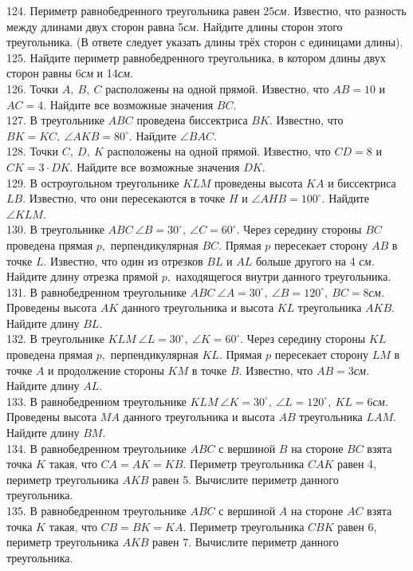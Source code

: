 \documentclass[12pt]{article}
\begin{document}
124. Периметр равнобедренного треугольника равен 25{\it см.} Известно, что разность между длинами двух сторон равна 5{\it см.} Найдите длины сторон этого треугольника. (В ответе следует указать длины трёх сторон с единицами длины).\\
125. Найдите периметр равнобедренного треугольника, в котором длины двух сторон равны 6{\it см} и 14{\it см.}\\
126. Точки $A,\ B,\ C$ расположены на одной прямой. Известно, что $AB=10$ и $AC=4.$ Найдите все возможные значения $BC.$\\
127. В треугольнике $ABC$ проведена биссектриса $BK.$ Известно, что $BK=KC,\ \angle AKB=80^\circ.$ Найдите $\angle BAC.$\\
128. Точки $C,\ D,\ K$ расположены на одной прямой. Известно, что $CD=8$ и $CK=3\cdot DK.$ Найдите все возможные значения $DK.$\\
129. В остроугольном треугольнике $KLM$ проведены высота $KA$ и биссектриса $LB.$ Известно, что они пересекаются в точке $H$ и $\angle AHB=100^\circ.$ Найдите $\angle KLM.$\\
130. В треугольнике $ABC\ \angle B=30^\circ,\ \angle C=60^\circ.$ Через середину стороны $BC$ проведена прямая $p,$ перпендикулярная $BC.$ Прямая $p$ пересекает сторону $AB$ в точке $L.$ Известно, что один из отрезков $BL$ и $AL$ больше другого на 4 {\it см.} Найдите длину отрезка прямой $p,$ находящегося внутри данного треугольника.\\
131. В равнобедренном треугольнике $ABC\ \angle A=30^\circ,\ \angle B=120^\circ,\ BC=8${\it см.} Проведены высота $AK$ данного треугольника и высота $KL$ треугольника $AKB.$ Найдите длину $BL.$\\
132. В треугольнике $KLM\ \angle L=30^\circ,\ \angle K=60^\circ.$ Через середину стороны $KL$ проведена прямая $p,$ перпендикулярная $KL.$ Прямая $p$ пересекает сторону $LM$ в точке $A$ и продолжение стороны $KM$ в точке $B.$ Известно, что $AB=3${\it см.} Найдите длину $AL.$\\
133. В равнобедренном треугольнике $KLM\ \angle K=30^\circ,\ \angle L=120^\circ,\ KL=6${\it см.} Проведены высота $MA$ данного треугольника и высота $AB$ треугольника $LAM.$ Найдите длину $BM.$\\
134. В равнобедренном треугольнике $ABC$ с вершиной $B$ на стороне $BC$ взята точка $K$ такая, что $CA=AK=KB.$ Периметр треугольника $CAK$ равен 4, периметр треугольника $AKB$ равен 5. Вычислите периметр данного треугольника.\\
135. В равнобедренном треугольнике $ABC$ с вершиной $A$ на стороне $AC$ взята точка $K$ такая, что $CB=BK=KA.$ Периметр треугольника $CBK$ равен 6, периметр треугольника $AKB$ равен 7. Вычислите периметр данного треугольника.\\
\end{document}
